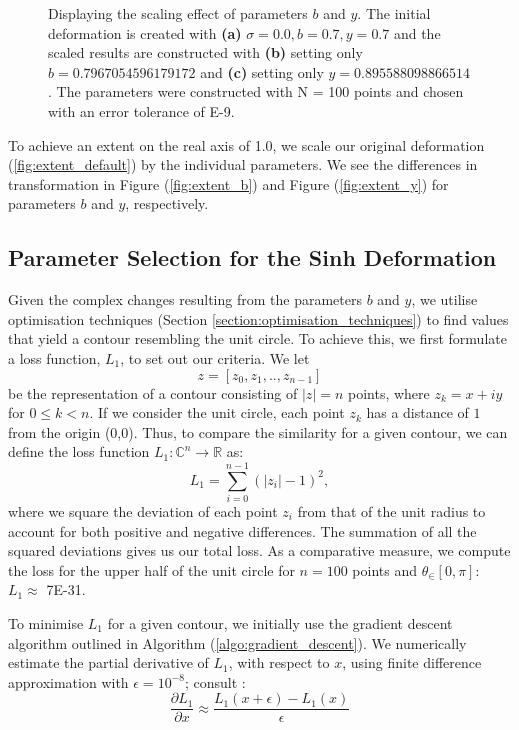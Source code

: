 \documentclass[a4paper]{report}
\begin{document}
\begin{figure}[H]
    \caption{Displaying the scaling effect of parameters $b$ and $y$. The initial deformation is created with \textbf{(a)} $\sigma = 0.0, b = 0.7, y = 0.7$ and the scaled results are constructed with \textbf{(b)} setting only $b = 0.7967054596179172$ and \textbf{(c)} setting only $y = 0.895588098866514$. The parameters were constructed with N = 100 points and chosen with an error tolerance of E-9.}
\end{figure}

To achieve an extent on the real axis of 1.0, we scale our original deformation (\autoref{fig:extent_default}) by the individual parameters. We see the differences in transformation in Figure (\ref{fig:extent_b}) and Figure (\ref{fig:extent_y}) for parameters $b$ and $y$, respectively.

\subsection{Parameter Selection for the Sinh Deformation}\label{section:parameter_selection}
Given the complex changes resulting from the parameters $b$ and $y$, we utilise optimisation techniques (Section \ref{section:optimisation_techniques}) to find values that yield a contour resembling the unit circle. To achieve this, we first formulate a loss function, $L_1$, to set out our criteria. We let 
\begin{equation*}
	z = [z_0, z_1, .., z_{n-1}]
\end{equation*}
be the representation of a contour consisting of $|z| = n$ points, where $z_k = x + iy$ for $0 \leq k < n$. If we consider the unit circle, each point $z_k$ has a distance of $1$ from the origin (0,0). Thus, to compare the similarity for a given contour, we can define the loss function $L_1: \mathbb{C}^n \rightarrow \mathbb{R}$ as:
\begin{equation}
L_1 = \sum_{i=0}^{n-1} \left( |z_i| - 1 \right)^2,
\end{equation}
where we square the deviation of each point $z_i$ from that of the unit radius to account for both positive and negative differences. The summation of all the squared deviations gives us our total loss. As a comparative measure, we compute the loss for the upper half of the unit circle for $n = 100$ points and $\theta_\in [0, \pi]$: $L_1\approx$ 7E-31.

To minimise $L_1$ for a given contour, we initially use the gradient descent algorithm outlined in Algorithm (\ref{algo:gradient_descent}). We numerically estimate the partial derivative of $L_1$, with respect to $x$, using finite difference approximation with $\epsilon = 10^{-8}$; consult \citep{burden1997numerical}:
\begin{equation}\label{eq:finite_diff}
\frac{\partial L_1}{\partial x} \approx \frac{L_1(x + \epsilon) - L_1(x)}{\epsilon}
\end{equation}
\end{document}
